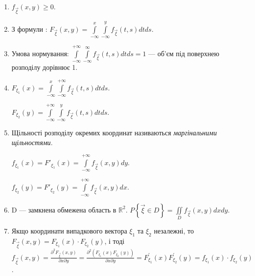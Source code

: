 \begin{enumerate}
    \item $f_{\vec{\xi}}(x, y) \geq 0$.
    \item З формули : $F_{\vec{\xi}}(x, y) 
    = \int\limits_{-\infty}^x \int\limits_{-\infty}^y f_{\vec{\xi}}(t, s) 
    dt ds $.
    \item Умова нормування: 
    $\int\limits_{-\infty}^{+\infty} \int\limits_{-\infty}^{\infty} f_{\vec{\xi}}(t, s) 
    dt ds = 1$ --- об'єм під поверхнею розподілу 
    дорівнює 1.
    \item $F_{\xi_1}(x) = \int\limits_{-\infty}^{x} \int\limits_{-\infty}^{+\infty} 
    f_{\vec{\xi}}(t, s) dt ds$.

    $F_{\xi_2}(y) = \int\limits_{-\infty}^{+\infty} \int\limits_{-\infty}^{y} 
    f_{\vec{\xi}}(t, s) dt ds$.
    \item Щільності розподілу окремих координат називаються 
    \emph{маргінальними щільностями}.

    $f_{\xi_1}(x) = F'_{\xi_1}(x) 
    = \int\limits_{-\infty}^{+\infty} f_{\vec{\xi}}(x, y) dy $.

    $f_{\xi_2}(y) = F'_{\xi_2}(y) 
    = \int\limits_{-\infty}^{+\infty} f_{\vec{\xi}}(x, y) dx $.
    
    \item D --- замкнена обмежена область в $\mathbb{R}^2$.
    $P\left\{ \vec{\xi} \in D \right\} = \iint\limits_D f_{\vec{\xi}}(x, y) 
    dx dy$.
    \item Якщо координати випадкового вектора $\xi_1$ та $\xi_2$ незалежні, то
    $F_{\vec{\xi}}(x, y) = 
    F_{\xi_1}(x)\cdot F_{\xi_2}(y)$, і тоді
    $f_{\vec{\xi}}(x, y) = \frac{\partial^2 F_{\vec{\xi}}(x, y)}
    {\partial x \partial y} = \frac{\partial^2(F_{\xi_1}(x)F_{\xi_2}(y))}{\partial x \partial y} 
    = F_{\xi_1}^\prime (x)F_{\xi_2}^\prime (y) = 
    f_{\xi_1}(x)\cdot f_{\xi_2}(y)$.
\end{enumerate}

